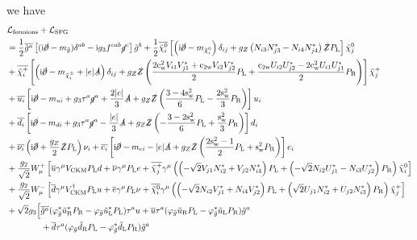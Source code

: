 \documentclass[CheatSheet]{subfiles}
\begin{document}
we have
\begin{equation}
  \begin{split}
&  \mathcal L\w{fermions} + \mathcal L\w{SFG}
\\&=
\frac{1}{2}
 \overline{\tig^a}\left[(\ii\cancel{\partial}-m_{\tilde g})\delta^{ab}-{\ii} g_3 f^{cab}\cancel{g}^c
\right]\tig^b
+ \frac{1}{2}  \overline{\neut[i]}\left[\left(\ii\cancel{\partial}-m_{\neut[i]}\right)\delta_{ij}
+ g_Z\left(N_{i3} N_{j3}^*-N_{i4} N_{j4}^*\right)\slashed{Z}\PL
\right]\neut[j]
\\&
+ \overline{\charP[i]}\left[
\left(\ii\cancel{\partial}-m_{\charPM[i]}
  + |e|\slashed{A}\right)\delta_{ij}
  + g_Z \slashed{Z}\left(\frac{2\cw^2 V_{i1} V_{j1}^*+\co{2\mathrm w}V_{i2} V_{j2}^*}{2}\PL
  + \frac{\co{2\mathrm w}U_{i2} U_{j2}^* -2\cw^2 U_{i1} U_{j1}^*}{2}\PR\right)
\right]\charP[j]
%
\\&
%
 + \overline{u_i}\left[\ii\cancel{\partial}-m_{ui}+g_3\tau^a \cancel{g}^a+\frac{2|e|}{3}\slashed{A}
+g_Z\slashed{Z}\left(\frac{3-4\sw^2}{6}\PL-\frac{2\sw^2}{3}\PR\right)
\right]u_i
\\&
%
 + \overline{d_i}\left[\ii\cancel{\partial}-m_{di}+g_3\tau^a \cancel{g}^a-\frac{|e|}{3}\slashed{A}
+g_Z\slashed{Z}\left(-\frac{3-2\sw^2}{6}\PL+\frac{\sw^2}{3}\PR\right)
\right]d_i
\\&
 + \overline{\nu_i}\left(\ii\cancel{\partial}  +\frac{g_Z}2\slashed{Z}\PL\right)\nu_i
 + \overline{e_i}\left[\ii\cancel{\partial}-m_{ei}-|e|\slashed{A}
+g_Z\slashed{Z}\left(\frac{2\sw^2-1}{2}\PL+\sw^2\PR\right)\right]e_i
\\&+\frac{g_2}{\sqrt2}W_\mu^+\left[
    \overline{u}\gamma^\mu V\w{CKM}\PL d
    +\overline{\nu}\gamma^\mu\PL e
    + \overline{\charP[j]}\gamma^\mu\left(
     \left(-\sqrt{2}V_{j1} N_{i2}^*+{V_{j2} N_{i4}^*}\right) \PL
    +\left(-\sqrt2 N_{i2} U_{j1}^*-N_{i3} U_{j2}^*\right)\PR
    \right)\neut[i]
\right]
\\&+\frac{g_2}{\sqrt2}W_\mu^-\left[
    \overline{d}\gamma^\mu V\w{CKM}^\dagger \PL u
    +\overline{e}\gamma^\mu\PL\nu
    +\overline{\neut[i]}\gamma^\mu\left(
       \left(-\sqrt2 N_{i2} V_{j1}^*+N_{i4} V_{j2}^*\right) \PL
      +\left(\sqrt{2}U_{j1} N_{i2}^*+{U_{j2} N_{i3}^*}\right) \PR
    \right)\charP[j]
\right]
\\&
 +\sqrt{2} g_3\Bigl[
   \overline{\tig^a}(\varphi^*_{\tilde g} \tuR^{*}\PR -\varphi_{\tilde g}\tuL^{*}\PL) \tau^{a}u
 + \overline{u}\tau^a(\varphi_{\tilde g}\tuR\PL-\varphi^*_{\tilde g}\tuL\PR) \tig^a
\\&\qquad\qquad
 + \overline{d}\tau^a(\varphi_{\tilde g}\tdR\PL-\varphi^*_{\tilde g}\tdL\PR) \tig^a

\end{split}
\end{equation}
\end{document}
